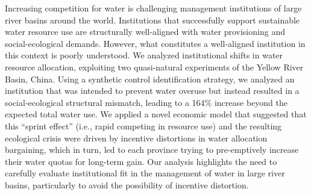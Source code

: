 Increasing competition for water is challenging management institutions of large river basins around the world. Institutions that successfully support sustainable water resource use are structurally well-aligned with water provisioning and social-ecological demands. However, what constitutes a well-aligned institution in this context is poorly understood. We analyzed institutional shifts in water resource allocation, exploiting two quasi-natural experiments of the Yellow River Basin, China. Using a synthetic control identification strategy, we analyzed an institution that was intended to prevent water overuse but instead resulted in a social-ecological structural mismatch, leading to a 164\% increase beyond the expected total water use. We applied a novel economic model that suggested that this “sprint effect” (i.e., rapid competing in resource use) and the resulting ecological crisis were driven by incentive distortions in water allocation bargaining, which in turn, led to each province trying to pre-emptively increase their water quotas for long-term gain. Our analysis highlights the need to carefully evaluate institutional fit in the management of water in large river basins, particularly to avoid the possibility of incentive distortion.
